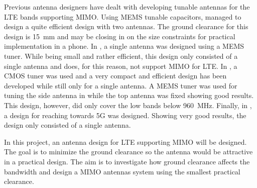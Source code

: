 Previous antenna designers have dealt with developing tunable antennas for the LTE bands supporting MIMO. Using MEMS tunable capacitors, \cite{ilvonen2014multiband} managed to design a quite efficient design with two antennas. The ground clearance for this design is \SI{15}{mm} and may be closing in on the size constraints for practical implementation in a phone. In \cite{morris2014tunable}, a single antenna was designed using a MEMS tuner. While being small and rather efficient, this design only consisted of a single antenna and does, for this reason, not support MIMO for LTE. In \cite{xia2015compact}, a CMOS tuner was used and a very compact and efficient design has been developed while still only for a single antenna. A MEMS tuner was used for tuning the side antenna in \cite{tatomirescu2015alternative} while the top antenna was fixed showing good results. This design, however, did only cover the low bands below \SI{960}{MHz}. Finally, in \cite{trinh2016reconfigurable}, a design for reaching towards 5G was designed. Showing very good results, the design only consisted of a single antenna.

In this project, an antenna design for LTE supporting MIMO will be designed. The goal is to minimize the ground clearance so the antenna would be attractive in a practical design. The aim is to investigate how ground clearance affects the bandwidth and design a MIMO antennas system using the smallest practical clearance.

